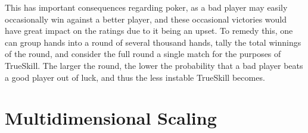 This has important consequences regarding poker, as a bad player may easily occasionally win against a better player, and these occasional victories would have great impact on the ratings due to it being an upset. To remedy this, one can group hands into a round of several thousand hands, tally the total winnings of the round, and consider the full round a single match for the purposes of TrueSkill. The larger the round, the lower the probability that a bad player beats a good player out of luck, and thus the less instable TrueSkill becomes.

\section{Multidimensional Scaling}